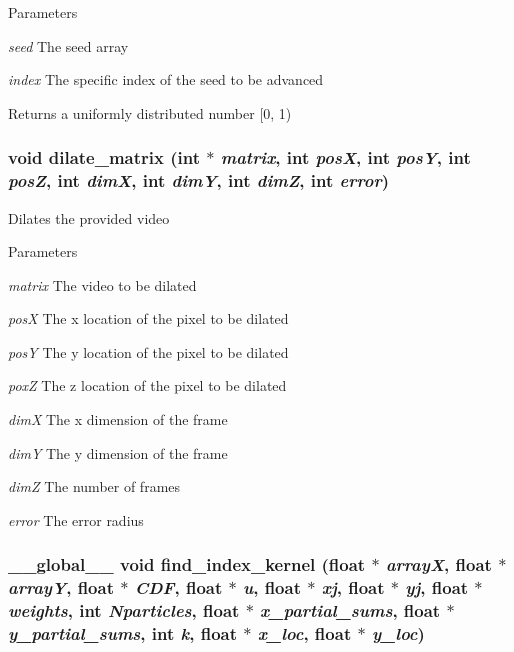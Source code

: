 \begin{DoxyParams}{Parameters}
\item[{\em seed}]The seed array \item[{\em index}]The specific index of the seed to be advanced \end{DoxyParams}
\begin{DoxyReturn}{Returns}
a uniformly distributed number \mbox{[}0, 1) 
\end{DoxyReturn}
\hypertarget{ex__particle__CUDA__float_8cu_af2a0216d5b584632a6508d5ad918734e}{
\subsubsection[{dilate\_\-matrix}]{\setlength{\rightskip}{0pt plus 5cm}void dilate\_\-matrix (int $\ast$ {\em matrix}, \/  int {\em posX}, \/  int {\em posY}, \/  int {\em posZ}, \/  int {\em dimX}, \/  int {\em dimY}, \/  int {\em dimZ}, \/  int {\em error})}}
\label{ex__particle__CUDA__float_8cu_af2a0216d5b584632a6508d5ad918734e}
Dilates the provided video 
\begin{DoxyParams}{Parameters}
\item[{\em matrix}]The video to be dilated \item[{\em posX}]The x location of the pixel to be dilated \item[{\em posY}]The y location of the pixel to be dilated \item[{\em poxZ}]The z location of the pixel to be dilated \item[{\em dimX}]The x dimension of the frame \item[{\em dimY}]The y dimension of the frame \item[{\em dimZ}]The number of frames \item[{\em error}]The error radius \end{DoxyParams}
\hypertarget{ex__particle__CUDA__float_8cu_aef627a69a7a035b4e1c8038dffde6e69}{
\subsubsection[{find\_\-index\_\-kernel}]{\setlength{\rightskip}{0pt plus 5cm}\_\-\_\-global\_\-\_\- void find\_\-index\_\-kernel (float $\ast$ {\em arrayX}, \/  float $\ast$ {\em arrayY}, \/  float $\ast$ {\em CDF}, \/  float $\ast$ {\em u}, \/  float $\ast$ {\em xj}, \/  float $\ast$ {\em yj}, \/  float $\ast$ {\em weights}, \/  int {\em Nparticles}, \/  float $\ast$ {\em x\_\-partial\_\-sums}, \/  float $\ast$ {\em y\_\-partial\_\-sums}, \/  int {\em k}, \/  float $\ast$ {\em x\_\-loc}, \/  float $\ast$ {\em y\_\-loc})}}
